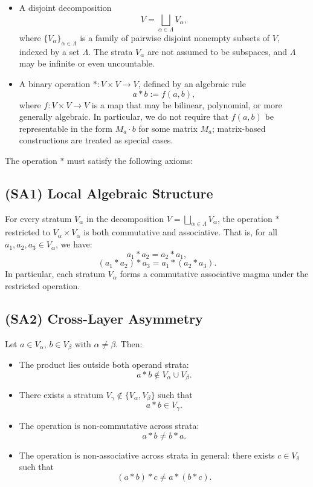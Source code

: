 \documentclass[12pt]{article}
\theoremstyle{definition}
\theoremstyle{plain}
\theoremstyle{remark}
\begin{document}
\begin{itemize}
    \item A disjoint decomposition
    \[
    V = \bigsqcup_{\alpha \in \Lambda} V_\alpha,
    \]
    where \( \{V_\alpha\}_{\alpha \in \Lambda} \) is a family of pairwise disjoint nonempty subsets of \( V \), indexed by a set \( \Lambda \). The strata \( V_\alpha \) are not assumed to be subspaces, and \( \Lambda \) may be infinite or even uncountable.

    \item A binary operation \( * : V \times V \to V \), defined by an algebraic rule
    \[
    a * b := f(a, b),
    \]
    where \( f : V \times V \to V \) is a map that may be bilinear, polynomial, or more generally algebraic. In particular, we do not require that \( f(a, b) \) be representable in the form \( M_a \cdot b \) for some matrix \( M_a \); matrix-based constructions are treated as special cases.
\end{itemize}

The operation \( * \) must satisfy the following axioms:

\subsection*{(SA1) Local Algebraic Structure}

For every stratum \( V_\alpha \) in the decomposition \( V = \bigsqcup_{\alpha \in \Lambda} V_\alpha \), the operation \( * \) restricted to \( V_\alpha \times V_\alpha \) is both commutative and associative. That is, for all \( a_1, a_2, a_3 \in V_\alpha \), we have:
\[
a_1 * a_2 = a_2 * a_1,
\]
\[
(a_1 * a_2) * a_3 = a_1 * (a_2 * a_3).
\]
In particular, each stratum \( V_\alpha \) forms a commutative associative magma under the restricted operation.

\subsection*{(SA2) Cross-Layer Asymmetry}

Let \( a \in V_\alpha \), \( b \in V_\beta \) with \( \alpha \ne \beta \). Then:

\begin{itemize}
    \item The product lies outside both operand strata:
    \[
    a * b \notin V_\alpha \cup V_\beta.
    \]

    \item There exists a stratum \( V_\gamma \notin \{V_\alpha, V_\beta\} \) such that
    \[
    a * b \in V_\gamma.
    \]

    \item The operation is non-commutative across strata:
    \[
    a * b \ne b * a.
    \]

    \item The operation is non-associative across strata in general: there exists \( c \in V_\delta \) such that
    \[
    (a * b) * c \ne a * (b * c).
    \]
\end{itemize}
\end{document}
